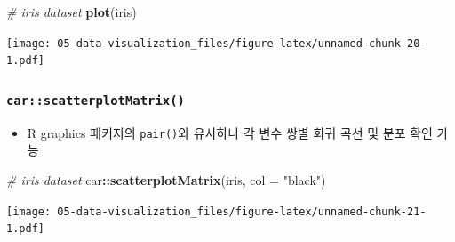 \documentclass[
  11pt,
]{krantz}
\newenvironment{Shaded}{\begin{snugshade}}{\end{snugshade}}
\newcommand{\CommentTok}[1]{\textcolor[rgb]{0.37,0.37,0.37}{\textit{#1}}}
\newcommand{\DataTypeTok}[1]{\textcolor[rgb]{0.27,0.27,0.27}{#1}}
\newcommand{\DecValTok}[1]{\textcolor[rgb]{0.06,0.06,0.06}{#1}}
\newcommand{\KeywordTok}[1]{\textcolor[rgb]{0.27,0.27,0.27}{\textbf{#1}}}
\newcommand{\NormalTok}[1]{#1}
\newcommand{\OperatorTok}[1]{\textcolor[rgb]{0.43,0.43,0.43}{\textbf{#1}}}
\newcommand{\OtherTok}[1]{\textcolor[rgb]{0.37,0.37,0.37}{#1}}
\newcommand{\StringTok}[1]{\textcolor[rgb]{0.5,0.5,0.5}{#1}}
\providecommand{\tightlist}{%
  \setlength{\itemsep}{0pt}\setlength{\parskip}{0pt}}
\begin{document}
\footnotesize

\begin{Shaded}
\begin{Highlighting}[]
\CommentTok{# iris dataset}
\KeywordTok{plot}\NormalTok{(iris)}
\end{Highlighting}
\end{Shaded}

\texttt{[image: 05-data-visualization\_files/figure-latex/unnamed-chunk-20-1.pdf]}

\normalsize

\hypertarget{car_scatterplotMatrix}{%
\subsubsection{\texorpdfstring{\textbf{\texttt{car::scatterplotMatrix()}}}{car::scatterplotMatrix()}}\label{car_scatterplotMatrix}}

\begin{itemize}
\tightlist
\item
  R graphics 패키지의 \texttt{pair()}와 유사하나 각 변수 쌍별 회귀 곡선 및 분포 확인 가능
\end{itemize}

\footnotesize

\begin{Shaded}
\begin{Highlighting}[]
\CommentTok{# iris dataset}
\NormalTok{car}\OperatorTok{::}\KeywordTok{scatterplotMatrix}\NormalTok{(iris, }\DataTypeTok{col =} \StringTok{"black"}\NormalTok{)}
\end{Highlighting}
\end{Shaded}

\texttt{[image: 05-data-visualization\_files/figure-latex/unnamed-chunk-21-1.pdf]}

\normalsize

\footnotesize

\begin{Shaded}
\end{Shaded}
\end{document}
